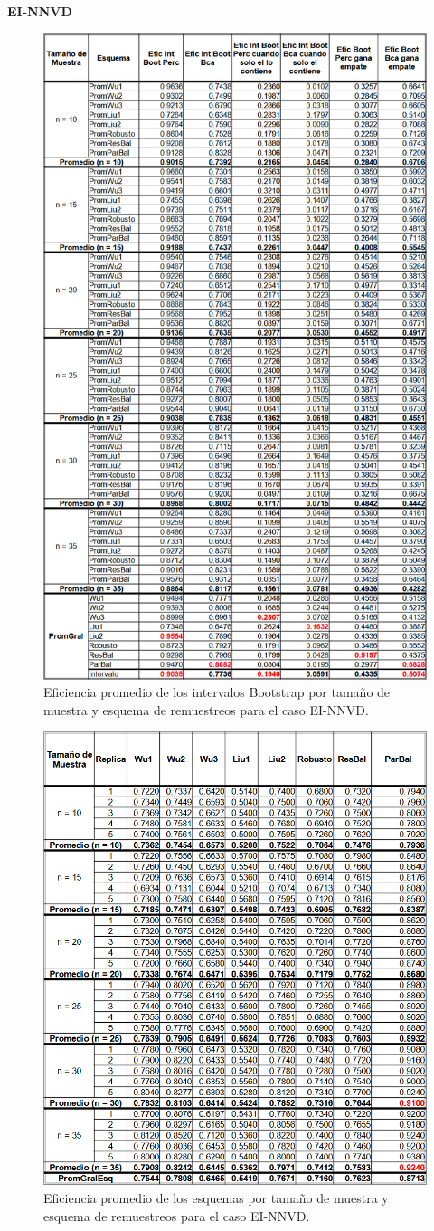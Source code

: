 \textbf{EI-NNVD}\\

\begin{figure}[ht] 
	\centering 
	\includegraphics[width=0.55\linewidth]{img/EI_NNVD_Efic_Boots.png} 
	\caption{Eficiencia promedio de los intervalos Bootstrap por tamaño de muestra y esquema de remuestreos para el caso EI-NNVD.} 
	\label{fig:EficPromIntBootsTamMuestEsqRemuEI-NNVD}
\end{figure}
\FloatBarrier




\begin{figure}[ht] 
	\centering 
	\includegraphics[width=0.70\linewidth]{img/EI_NNVD_Efic_Esq.png} 
	\caption{Eficiencia promedio de los esquemas por tamaño de muestra y esquema de remuestreos para el caso EI-NNVD.} 
	\label{fig:EficPromEsqTamMuesEsqRemuEI-NNVD}
\end{figure}
\FloatBarrier


